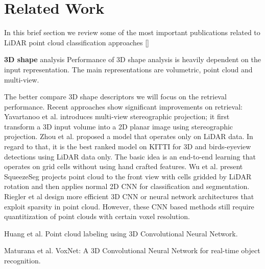 \section{Related Work}

In this brief section we review some of the most important publications related to LiDAR point cloud classification approaches []

\textbf{3D shape} analysis Performance of 3D shape analysis is heavily dependent on the input representation. The main representations are volumetric, point cloud and multi-view.

The better compare 3D shape descriptors we will focus on the retrieval performance. Recent approaches show significant improvements on retrieval: Yavartanoo et al. \cite{DBLP:journals/corr/abs-1811-01571} introduces multi-view stereographic projection; it first transform a 3D input volume into a 2D planar image using stereographic projection.
Zhou et al. \cite{Zhou_2018_CVPR} proposed a model that operates only on LiDAR data. In regard to that, it is the best ranked model on KITTI \cite{geiger2012we} for 3D and birds-eyeview detections using LiDAR data only. The basic idea is an end-to-end learning that operates on grid cells without using hand crafted features.
Wu et al. \cite{DBLP:conf/icra/WuWYK18} present SqueezeSeg projects point cloud to the front view with cells gridded by LiDAR rotation and then applies normal 2D CNN
for classification and segmentation. 
Riegler et al \cite{DBLP:conf/cvpr/RieglerUG17} design more efficient 3D CNN or neural network architectures that exploit sparsity in point cloud. However,
these CNN based methods still require quantitization of point clouds with certain voxel resolution.








 

Huang et al. \cite{DBLP:conf/icpr/HuangY16}  Point cloud labeling using 3D Convolutional Neural Network. 


Maturana et al. \cite{DBLP:conf/iros/MaturanaS15}  VoxNet: {A} 3D Convolutional Neural Network for real-time object recognition.




